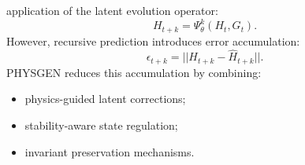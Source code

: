 application of the latent evolution operator: \begin{equation} H_{t+k} = \Psi_{\theta}^{k} ( H_t,G_t ). \end{equation} However, recursive prediction introduces error accumulation: \begin{equation} \epsilon_{t+k} = || H_{t+k} - \hat{H}_{t+k} ||. \end{equation} PHYSGEN reduces this accumulation by combining: \begin{itemize} \item physics-guided latent corrections; \item stability-aware state regulation; \item invariant preservation mechanisms. \end{itemize} %